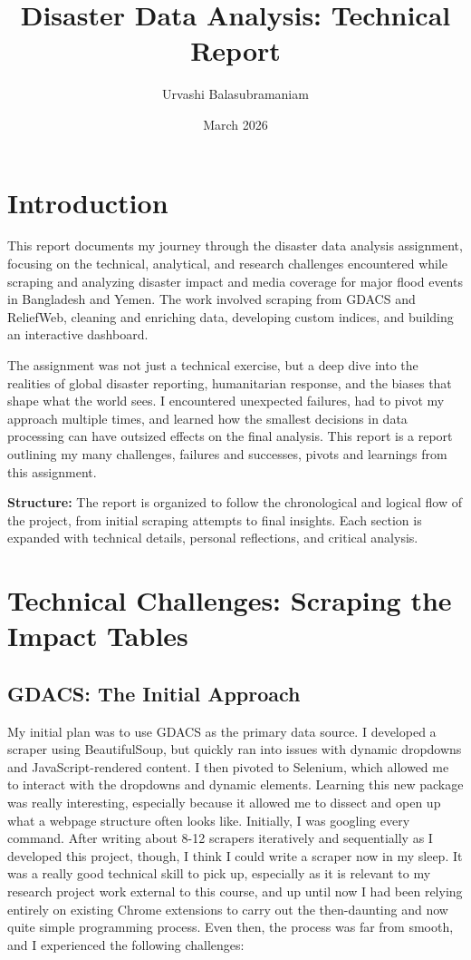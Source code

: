 \documentclass[12pt]{article}
\title{Disaster Data Analysis: Technical Report}
\author{Urvashi Balasubramaniam}
\date{March 2026}
\begin{document}
\maketitle

\tableofcontents

\section{Introduction}
This report documents my journey through the disaster data analysis assignment, focusing on the technical, analytical, and research challenges encountered while scraping and analyzing disaster impact and media coverage for major flood events in Bangladesh and Yemen. The work involved scraping from GDACS and ReliefWeb, cleaning and enriching data, developing custom indices, and building an interactive dashboard. 

The assignment was not just a technical exercise, but a deep dive into the realities of global disaster reporting, humanitarian response, and the biases that shape what the world sees. I encountered unexpected failures, had to pivot my approach multiple times, and learned how the smallest decisions in data processing can have outsized effects on the final analysis. This report is a report outlining my many challenges, failures and successes, pivots and learnings from this assignment. 

\textbf{Structure:} The report is organized to follow the chronological and logical flow of the project, from initial scraping attempts to final insights. Each section is expanded with technical details, personal reflections, and critical analysis.

\section{Technical Challenges: Scraping the Impact Tables}
\subsection{GDACS: The Initial Approach}
My initial plan was to use GDACS as the primary data source. I developed a scraper using BeautifulSoup, but quickly ran into issues with dynamic dropdowns and JavaScript-rendered content. I then pivoted to Selenium, which allowed me to interact with the dropdowns and dynamic elements. Learning this new package was really interesting, especially because it allowed me to dissect and open up what a webpage structure often looks like. Initially, I was googling every command. After writing about 8-12 scrapers iteratively and sequentially as I developed this project, though, I think I could write a scraper now in my sleep. It was a really good technical skill to pick up, especially as it is relevant to my research project work external to this course, and up until now I had been relying entirely on existing Chrome extensions to carry out the then-daunting and now quite simple programming process.
Even then, the process was far from smooth, and I experienced the following challenges:
\end{document}
